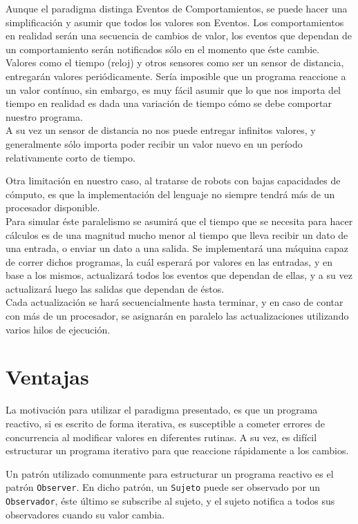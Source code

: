   Aunque el paradigma distinga Eventos de Comportamientos, se puede hacer una simplificación y
asumir que todos los valores son Eventos. Los comportamientos en realidad serán una secuencia de
cambios de valor, los eventos que dependan de un comportamiento serán notificados sólo en el momento
que éste cambie.\\
  Valores como el tiempo (reloj) y otros sensores como ser un sensor de distancia, entregarán valores
periódicamente. Sería imposible que un programa reaccione a un valor contínuo, sin embargo, es muy fácil
asumir que lo que nos importa del tiempo en realidad es dada una variación de tiempo cómo se debe
comportar nuestro programa.\\
  A su vez un sensor de distancia no nos puede entregar infinitos valores, y generalmente sólo importa
poder recibir un valor nuevo en un período relativamente corto de tiempo.

  Otra limitación en nuestro caso, al tratarse de robots con bajas capacidades de cómputo, es que
la implementación del lenguaje no siempre tendrá más de un procesador disponible.\\
  Para simular éste paralelismo se asumirá que el tiempo que se necesita para hacer cálculos es de
una magnitud mucho menor al tiempo que lleva recibir un dato de una entrada, o enviar un dato a una salida.
  Se implementará una máquina capaz de correr dichos programas, la cuál esperará por valores en las entradas,
y en base a los mismos, actualizará todos los eventos que dependan de ellas, y a su vez actualizará luego
las salidas que dependan de éstos.\\
  Cada actualización se hará secuencialmente hasta terminar, y en caso de contar con más de un procesador, se
asignarán en paralelo las actualizaciones utilizando varios hilos de ejecución.\\

\section{Ventajas}

  La motivación para utilizar el paradigma presentado, es que un programa reactivo, si es escrito de
forma iterativa, es susceptible a cometer errores de concurrencia al modificar valores en diferentes
rutinas. A su vez, es difícil estructurar un programa iterativo para que reaccione rápidamente a
los cambios.

  Un patrón utilizado comunmente para estructurar un programa reactivo es el patrón \texttt{Observer}.
En dicho patrón, un \texttt{Sujeto} puede ser observado por un \texttt{Observador}, éste último se
subscribe al sujeto, y el sujeto notifica a todos sus observadores cuando su valor cambia.
  
